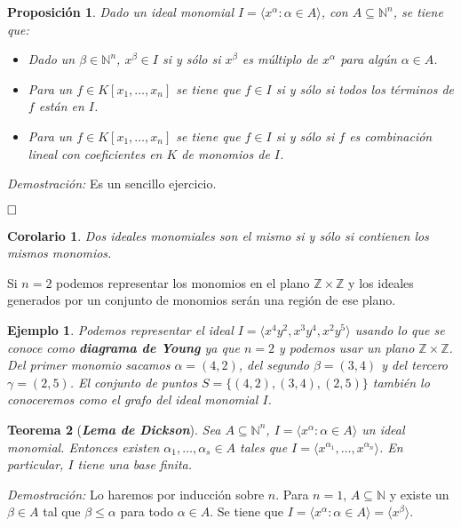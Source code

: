 \documentclass[12pt]{article}
\newtheorem{theorem}{Teorema}[section]
\newtheorem{proposition}[theorem]{Proposición}
\newtheorem{example}{Ejemplo}[theorem]
\newtheorem{corolario}{Corolario}[theorem]
\begin{document}
\begin{proposition}\label{eq:preld} Dado un ideal monomial $I = \langle x^\alpha: \alpha \in A \rangle$, con $A \subseteq \mathbb{N}^n$, se tiene que: 
\begin{itemize}
\item Dado un $\beta \in \mathbb{N}^n$, $x^\beta \in I$ si y sólo si $x^\beta$ es múltiplo de $x^\alpha$ para algún $\alpha \in A$.
\item Para un $f \in K[x_1, \ldots, x_n]$ se tiene que $f \in I$ si y sólo si todos los términos de $f$ están en $I$.
\item Para un $f \in K[x_1, \ldots, x_n]$ se tiene que $f \in I$ si y sólo si $f$ es combinación lineal con coeficientes en $K$ de monomios de $I$.
\end{itemize}
\end{proposition}
\emph{Demostración: }Es un sencillo ejercicio. 

$\hfill \square$

\begin{corolario}Dos ideales monomiales son el mismo si y sólo si contienen los mismos monomios.
\end{corolario}

Si $n=2$ podemos representar los monomios en el plano $\mathbb{Z} \times \mathbb{Z}$ y los ideales generados por un conjunto de monomios serán una región de ese plano.

\begin{example}Podemos representar el ideal $I = \langle x^4y^2, x^3y^4, x^2y^5\rangle$ usando lo que se conoce como \textbf{diagrama de Young} ya que $n=2$ y podemos usar un plano $\mathbb{Z} \times \mathbb{Z}$. Del primer monomio sacamos $\alpha = (4,2)$, del segundo $\beta = (3,4)$ y del tercero $\gamma = (2,5)$. El conjunto de puntos $S = \lbrace (4,2), (3,4), (2,5) \rbrace$ también lo conoceremos como el \textit{grafo del ideal monomial $I$}.
\end{example}

\begin{theorem}[\textbf{\textit{Lema de Dickson}}]
Sea $A \subseteq \mathbb{N}^n$, $I = \langle x^\alpha: \alpha \in A \rangle$ un ideal monomial. Entonces existen $\alpha_1, \ldots, \alpha_s \in A$ tales que $I = \langle x^{\alpha_1}, \ldots, x^{\alpha_n} \rangle$. En particular, $I$ tiene una base finita.
\end{theorem}
\emph{Demostración: }Lo haremos por inducción sobre $n$. Para $n=1$, $A\subseteq \mathbb{N}$ y existe un $\beta \in A$ tal que $\beta \leq \alpha$ para todo $\alpha \in A$. Se tiene que $I = \langle x^\alpha: \alpha \in A \rangle = \langle x^\beta \rangle$.
\end{document}
